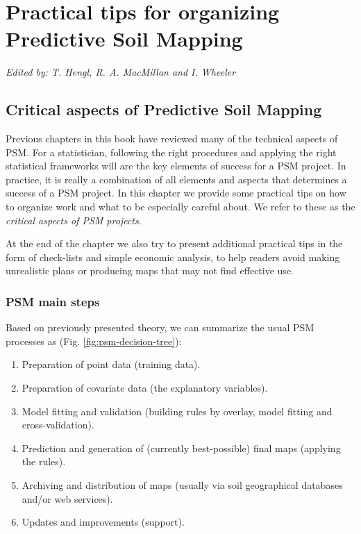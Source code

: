 \documentclass[graybox,natbib,nospthms,UStrade]{svmono}
\begin{document}
\hypertarget{practical-tips}{%
\chapter{Practical tips for organizing Predictive Soil Mapping}\label{practical-tips}}

\emph{Edited by: T. Hengl, R. A. MacMillan and I. Wheeler}

\hypertarget{critical-aspects-of-predictive-soil-mapping}{%
\section{Critical aspects of Predictive Soil Mapping}\label{critical-aspects-of-predictive-soil-mapping}}

Previous chapters in this book have reviewed many of the technical aspects of PSM.
For a statistician, following the right procedures and applying the right statistical frameworks will are
the key elements of success for a PSM project. In practice,
it is really a combination of all elements and aspects that determines a success of a PSM project.
In this chapter we provide some practical tips on how to organize work and what to be especially
careful about. We refer to these as the \emph{critical aspects of PSM projects}.

At the end of the chapter we also try to present additional practical tips in the form of check-lists and
simple economic analysis, to help readers avoid making unrealistic plans or producing maps
that may not find effective use.

\hypertarget{psm-main-steps}{%
\subsection{PSM main steps}\label{psm-main-steps}}

Based on previously presented theory, we can summarize the usual PSM processes as (Fig. \ref{fig:psm-decision-tree}):

\begin{enumerate}
\def\labelenumi{\arabic{enumi}.}
\item
  Preparation of point data (training data).
\item
  Preparation of covariate data (the explanatory variables).
\item
  Model fitting and validation (building rules by overlay, model fitting and cross-validation).
\item
  Prediction and generation of (currently best-possible) final maps
  (applying the rules).
\item
  Archiving and distribution of maps (usually via soil geographical
  databases and/or web services).
\item
  Updates and improvements (support).
\end{enumerate}
\end{document}
